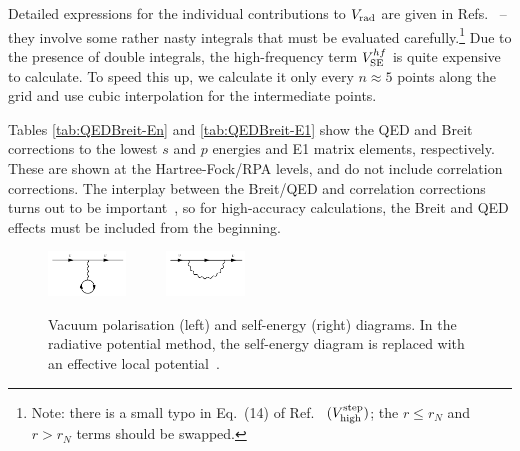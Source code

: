 \documentclass[10pt,twocolumn,a4paper]{article}%
\begin{document}
Detailed expressions for the individual contributions to $V_{\rm rad}$ are given in Refs.~\cite{FlambaumQED2005,GingesQED2015,Ginges2016} -- they involve some rather nasty integrals that must be evaluated carefully.\footnote{Note: there is a small typo in Eq.~(14)  of Ref.~\cite{Ginges2016} $(V^{\rm step}_{\rm high})$; the $r\leq r_N$ and  $r> r_N$ terms should be swapped.}
Due to the presence of double integrals, the high-frequency term $V_{\rm SE}^{hf}$ is quite expensive to calculate.
To speed this up, we calculate it only every $n\approx5$ points along the grid
and use cubic interpolation for the intermediate points.

Tables \ref{tab:QEDBreit-En} and \ref{tab:QEDBreit-E1} show the QED and Breit corrections to the lowest $s$ and $p$ energies and E1 matrix elements, respectively.
These are shown at the Hartree-Fock/RPA levels, and do not include correlation corrections.
The interplay between the Breit/QED and correlation corrections turns out to be important~\cite{Derevianko2001,GingesQED2015,Ginges2016}, so for high-accuracy calculations, the Breit and QED effects must be included from the beginning.



\begin{figure}%
\centering\tiny
\includegraphics[width=0.185\textwidth]{img/VacuumPol}~~~~~
\includegraphics[width=0.185\textwidth]{img/SelfEnergy}
\caption{\small Vacuum polarisation (left) and self-energy (right) diagrams. In the radiative potential method, the self-energy diagram is replaced with an effective local potential~\cite{FlambaumQED2005}.\label{fig:QED}}
\end{figure}
\end{document}
